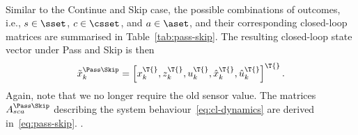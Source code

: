 %
\\
Similar to the Continue and Skip case, the possible combinations of outcomes, i.e., $s \in \sset$, $c \in \csset$, and $a \in \aset$, and their corresponding closed-loop matrices are summarised in Table~\ref{tab:pass-skip}.
The resulting closed-loop state vector under Pass and Skip is then
%
\begin{equation*}
    \tilde x_k^{\Pass\Skip} = \left[ x^\T{}_k, z^\T{}_k, u^\T{}_k, \hat x^\T{}_k, \hat u^\T{}_k \right]^\T{}.
\end{equation*}
%
Again, note that we no longer require the old sensor value.
The matrices $A_{sca}^{\Pass\Skip}$ describing the system behaviour~\eqref{eq:cl-dynamics} are derived in~\eqref{eq:pass-skip}.
%
%
%
.

